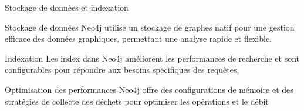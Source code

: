 \begin{frame}{Stockage de données et indexation}
  \begin{block}{Stockage de données}
    Neo4j utilise un stockage de graphes natif pour une gestion efficace des données graphiques, permettant une analyse rapide et flexible.
  \end{block}
  \begin{block}{Indexation}
    Les index dans Neo4j améliorent les performances de recherche et sont configurables pour répondre aux besoins spécifiques des requêtes.
  \end{block}
  \begin{block}{Optimisation des performances}
    Neo4j offre des configurations de mémoire et des stratégies de collecte des déchets pour optimiser les opérations et le débit
  \end{block}
\end{frame}